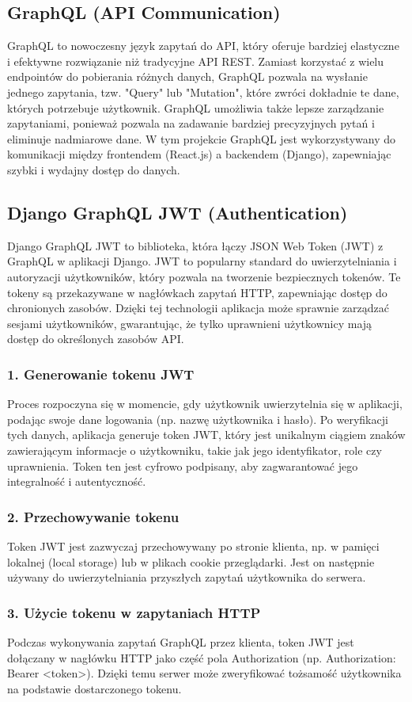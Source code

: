 \documentclass[wmii,inf,inz]{uwmthesis} %
\begin{document}
\subsection{GraphQL (API Communication)}
GraphQL to nowoczesny język zapytań do API, który oferuje bardziej elastyczne i efektywne rozwiązanie niż tradycyjne API REST. Zamiast korzystać z wielu endpointów do pobierania różnych danych, GraphQL pozwala na wysłanie jednego zapytania, tzw. "Query" lub "Mutation", które zwróci dokładnie te dane, których potrzebuje użytkownik. GraphQL umożliwia także lepsze zarządzanie zapytaniami, ponieważ pozwala na zadawanie bardziej precyzyjnych pytań i eliminuje nadmiarowe dane. W tym projekcie GraphQL jest wykorzystywany do komunikacji między frontendem (React.js) a backendem (Django), zapewniając szybki i wydajny dostęp do danych.
\subsection{Django GraphQL JWT (Authentication)}
Django GraphQL JWT to biblioteka, która łączy JSON Web Token (JWT) z GraphQL w aplikacji Django. JWT to popularny standard do uwierzytelniania i autoryzacji użytkowników, który pozwala na tworzenie bezpiecznych tokenów. Te tokeny są przekazywane w nagłówkach zapytań HTTP, zapewniając dostęp do chronionych zasobów. Dzięki tej technologii aplikacja może sprawnie zarządzać sesjami użytkowników, gwarantując, że tylko uprawnieni użytkownicy mają dostęp do określonych zasobów API.
\subsubsection{1. Generowanie tokenu JWT}
Proces rozpoczyna się w momencie, gdy użytkownik uwierzytelnia się w aplikacji, podając swoje dane logowania (np. nazwę użytkownika i hasło). Po weryfikacji tych danych, aplikacja generuje token JWT, który jest unikalnym ciągiem znaków zawierającym informacje o użytkowniku, takie jak jego identyfikator, role czy uprawnienia. Token ten jest cyfrowo podpisany, aby zagwarantować jego integralność i autentyczność.
\subsubsection{2. Przechowywanie tokenu}
Token JWT jest zazwyczaj przechowywany po stronie klienta, np. w pamięci lokalnej (local storage) lub w plikach cookie przeglądarki. Jest on następnie używany do uwierzytelniania przyszłych zapytań użytkownika do serwera.
\subsubsection{3. Użycie tokenu w zapytaniach HTTP}
Podczas wykonywania zapytań GraphQL przez klienta, token JWT jest dołączany w nagłówku HTTP jako część pola Authorization (np. Authorization: Bearer <token>). Dzięki temu serwer może zweryfikować tożsamość użytkownika na podstawie dostarczonego tokenu.
\end{document}
